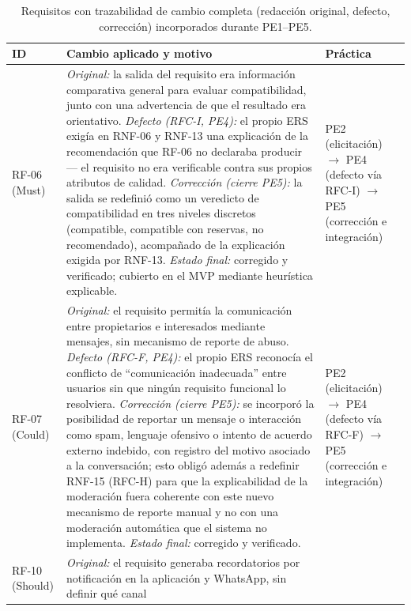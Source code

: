 \documentclass[journal,onecolumn]{IEEEtran}
\begin{document}
\begin{table}[H]
	\centering
	\caption{Requisitos con trazabilidad de cambio completa (redacción original, defecto, corrección) incorporados durante PE1--PE5.}
	\label{tab:cambios-clave}
	\footnotesize
	\renewcommand{\arraystretch}{1.3}
	\begin{tabularx}{\textwidth}{
		|>{\raggedright\arraybackslash}p{1.1cm}
		|>{\raggedright\arraybackslash}X
		|>{\raggedright\arraybackslash}p{2.6cm}|}
		\hline
		\textbf{ID} & \textbf{Cambio aplicado y motivo} & \textbf{Práctica} \\
		\hline
		RF-06
		(Must) &
		\emph{Original:} la salida del requisito era información comparativa
		general para evaluar compatibilidad, junto con una advertencia de
		que el resultado era orientativo. \emph{Defecto (RFC-I, PE4):} el
		propio ERS exigía en RNF-06 y RNF-13 una explicación de la
		recomendación que RF-06 no declaraba producir --- el requisito no era
		verificable contra sus propios atributos de calidad. \emph{Corrección
		(cierre PE5):} la salida se redefinió como un veredicto de
		compatibilidad en tres niveles discretos (compatible, compatible con
		reservas, no recomendado), acompañado de la explicación exigida por
		RNF-13. \emph{Estado final:} corregido y verificado; cubierto en el
		MVP mediante heurística explicable. &
		PE2 (elicitación) $\rightarrow$ PE4 (defecto vía RFC-I) $\rightarrow$
		PE5 (corrección e integración) \\
		\hline
		RF-07
		(Could) &
		\emph{Original:} el requisito permitía la comunicación entre
		propietarios e interesados mediante mensajes, sin mecanismo de
		reporte de abuso. \emph{Defecto (RFC-F, PE4):} el propio ERS
		reconocía el conflicto de ``comunicación inadecuada'' entre usuarios
		sin que ningún requisito funcional lo resolviera. \emph{Corrección
		(cierre PE5):} se incorporó la posibilidad de reportar un mensaje o
		interacción como spam, lenguaje ofensivo o intento de acuerdo externo
		indebido, con registro del motivo asociado a la conversación; esto
		obligó además a redefinir RNF-15 (RFC-H) para que la explicabilidad
		de la moderación fuera coherente con este nuevo mecanismo de reporte
		manual y no con una moderación automática que el sistema no
		implementa. \emph{Estado final:} corregido y verificado. &
		PE2 (elicitación) $\rightarrow$ PE4 (defecto vía RFC-F) $\rightarrow$
		PE5 (corrección e integración) \\
		\hline
		RF-10
		(Should) &
		\emph{Original:} el requisito generaba recordatorios por
		notificación en la aplicación y WhatsApp, sin definir qué canal

\end{tabularx}
\end{table}
\end{document}
